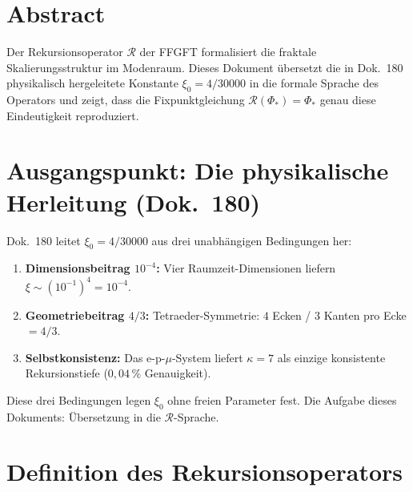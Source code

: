 
\section*{Abstract}

Der Rekursionsoperator $\mathcal{R}$ der FFGFT formalisiert die
fraktale Skalierungsstruktur im Modenraum. Dieses Dokument übersetzt
die in Dok.~180 physikalisch hergeleitete Konstante
$\xi_0 = 4/30000$ in die formale Sprache des Operators und zeigt,
dass die Fixpunktgleichung $\mathcal{R}(\Phi_*) = \Phi_*$ genau
diese Eindeutigkeit reproduziert.

\section{Ausgangspunkt: Die physikalische Herleitung (Dok.~180)}

Dok.~180 leitet $\xi_0 = 4/30000$ aus drei unabhängigen Bedingungen her:

\begin{enumerate}
  \item \textbf{Dimensionsbeitrag $10^{-4}$:}
    Vier Raumzeit-Dimensionen liefern $\xi \sim (10^{-1})^4 = 10^{-4}$.
  \item \textbf{Geometriebeitrag $4/3$:}
    Tetraeder-Symmetrie: $4$ Ecken / $3$ Kanten pro Ecke $= 4/3$.
  \item \textbf{Selbstkonsistenz:}
    Das e-p-$\mu$-System liefert $\kappa = 7$ als einzige
    konsistente Rekursionstiefe ($0{,}04\,\%$ Genauigkeit).
\end{enumerate}

Diese drei Bedingungen legen $\xi_0$ ohne freien Parameter fest.
Die Aufgabe dieses Dokuments: Übersetzung in die $\mathcal{R}$-Sprache.

\section{Definition des Rekursionsoperators}

